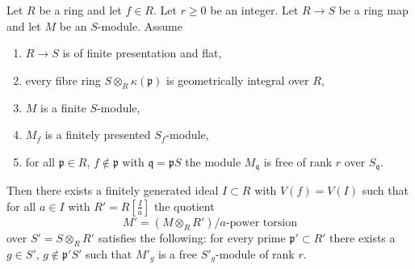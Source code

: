 \begin{lemma}
\label{lemma-helper-blowup-affine-space}
Let $R$ be a ring and let $f \in R$. Let $r\geq 0$ be an integer.
Let $R \to S$ be a ring map and let $M$ be an $S$-module. Assume
\begin{enumerate}
\item $R \to S$ is of finite presentation and flat,
\item every fibre ring $S \otimes_R \kappa(\mathfrak p)$ is
geometrically integral over $R$,
\item $M$ is a finite $S$-module,
\item $M_f$ is a finitely presented $S_f$-module,
\item for all $\mathfrak p \in R$, $f \not \in \mathfrak p$ with
$\mathfrak q = \mathfrak pS$ the module $M_{\mathfrak q}$ is free
of rank $r$ over $S_\mathfrak q$.
\end{enumerate}
Then there exists a finitely generated ideal $I \subset R$ with
$V(f) = V(I)$ such that for all $a \in I$ with $R' = R[\frac{I}{a}]$
the quotient
$$
M' = (M \otimes_R R')/a\text{-power torsion}
$$
over $S' = S \otimes_R R'$ satisfies the following: for every prime
$\mathfrak p' \subset R'$ there exists a $g \in S'$,
$g \not \in \mathfrak p'S'$ such that $M'_g$ is a free $S'_g$-module
of rank $r$.
\end{lemma}

